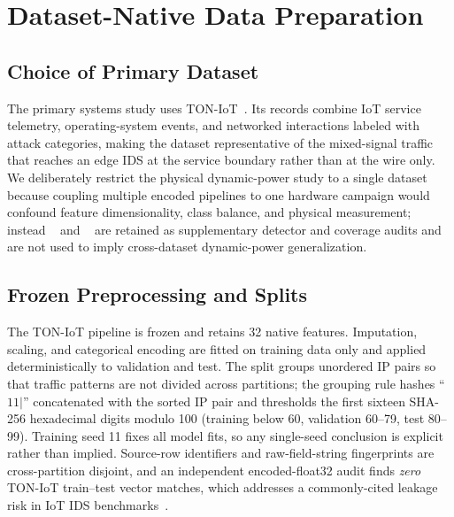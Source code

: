 \section{Dataset-Native Data Preparation}
\label{sec:data}
\subsection{Choice of Primary Dataset}
The primary systems study uses TON-IoT~\cite{TONSource}. Its records combine IoT service telemetry, operating-system events, and networked interactions labeled with attack categories, making the dataset representative of the mixed-signal traffic that reaches an edge IDS at the service boundary rather than at the wire only. We deliberately restrict the physical dynamic-power study to a single dataset because coupling multiple encoded pipelines to one hardware campaign would confound feature dimensionality, class balance, and physical measurement; instead \cic{}~\cite{CICSource} and \nb{}~\cite{NBaIoTSource} are retained as supplementary detector and coverage audits and are not used to imply cross-dataset dynamic-power generalization.

\subsection{Frozen Preprocessing and Splits}
The TON-IoT pipeline is frozen and retains 32 native features. Imputation, scaling, and categorical encoding are fitted on training data only and applied deterministically to validation and test. The split groups unordered IP pairs so that traffic patterns are not divided across partitions; the grouping rule hashes ``$11\vert$'' concatenated with the sorted IP pair and thresholds the first sixteen SHA-256 hexadecimal digits modulo 100 (training below 60, validation 60--79, test 80--99). Training seed 11 fixes all model fits, so any single-seed conclusion is explicit rather than implied. Source-row identifiers and raw-field-string fingerprints are cross-partition disjoint, and an independent encoded-float32 audit finds \emph{zero} TON-IoT train--test vector matches, which addresses a commonly-cited leakage risk in IoT IDS benchmarks~\cite{Arp2022}.

